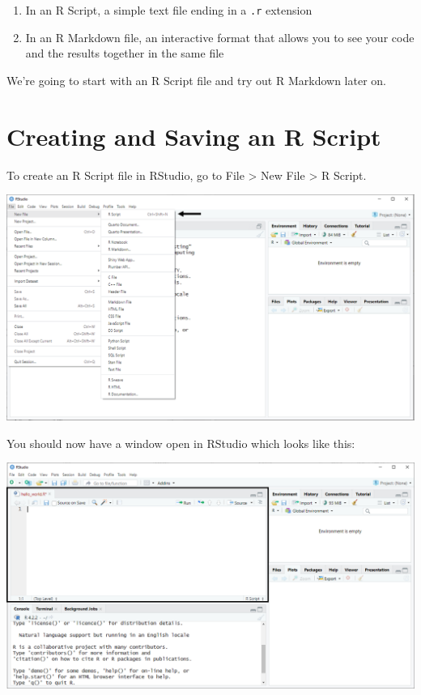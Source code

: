 \documentclass[
]{book}
\begin{document}
\begin{enumerate}
\def\labelenumi{\arabic{enumi}.}
\item
  In an R Script, a simple text file ending in a \texttt{.r} extension
\item
  In an R Markdown file, an interactive format that allows you to see your code and the results together in the same file
\end{enumerate}

We're going to start with an R Script file and try out R Markdown later on.

\hypertarget{creating-and-saving-an-r-script}{%
\section{Creating and Saving an R Script}\label{creating-and-saving-an-r-script}}

To create an R Script file in RStudio, go to File \textgreater{} New File \textgreater{} R Script.

\includegraphics{docs/_main_files/figure-html/RStudio_Opening an R Script File.png}

You should now have a window open in RStudio which looks like this:

\includegraphics{docs/_main_files/figure-html/RStudio_Opened RScript.png}
\end{document}
